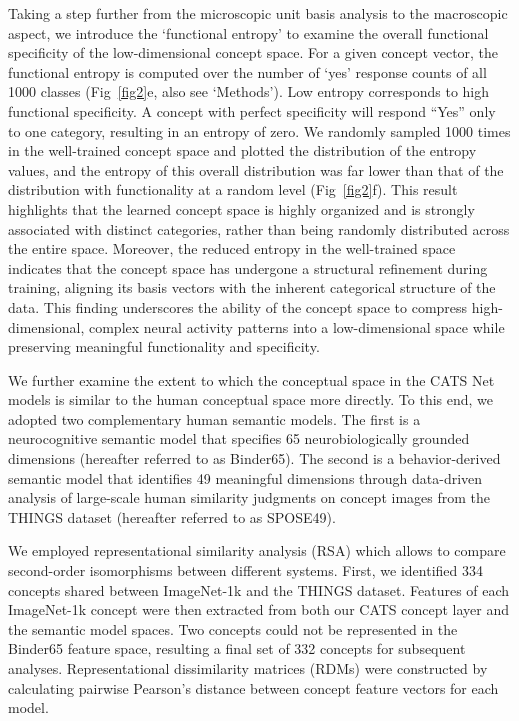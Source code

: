 \documentclass[pdflatex,sn-mathphys-num,lineno]{sn-jnl}%
\begin{document}
\begin{CJK}{UTF8}{gbsn}
Taking a step further from the microscopic unit basis analysis to the macroscopic aspect, we introduce the ‘functional entropy’ to examine the overall functional specificity of the low-dimensional concept space. For a given concept vector, the functional entropy is computed over the number of ‘yes’ response counts of all 1000 classes (Fig~\ref{fig2}e, also see ‘Methods’). Low entropy corresponds to high functional specificity. A concept with perfect specificity will respond “Yes” only to one category, resulting in an entropy of zero. We randomly sampled 1000 times in the well-trained concept space and plotted the distribution of the entropy values, and the entropy of this overall distribution was far lower than that of the distribution with functionality at a random level (Fig~\ref{fig2}f). This result highlights that the learned concept space is highly organized and is strongly associated with distinct categories, rather than being randomly distributed across the entire space. Moreover, the reduced entropy in the well-trained space indicates that the concept space has undergone a structural refinement during training, aligning its basis vectors with the inherent categorical structure of the data. This finding underscores the ability of the concept space to compress high-dimensional, complex neural activity patterns into a low-dimensional space while preserving meaningful functionality and specificity.

We further examine the extent to which the conceptual space in the CATS Net models is similar to the human conceptual space more directly. To this end, we adopted two complementary human semantic models. The first is a neurocognitive semantic model that specifies 65 neurobiologically grounded dimensions \cite{binder_toward_2016} (hereafter referred to as Binder65). The second is a behavior-derived semantic model that identifies 49 meaningful dimensions through data-driven analysis of large-scale human similarity judgments on concept images from the THINGS dataset \cite{hebart_revealing_2020} (hereafter referred to as SPOSE49).

We employed representational similarity analysis (RSA) \cite{kriegeskorte_representational_2008} which allows to compare second-order isomorphisms between different systems. First, we identified 334 concepts shared between ImageNet-1k and the THINGS dataset. Features of each ImageNet-1k concept were then extracted from both our CATS concept layer and the semantic model spaces. Two concepts could not be represented in the Binder65 feature space, resulting a final set of 332 concepts for subsequent analyses. Representational dissimilarity matrices (RDMs) were constructed by calculating pairwise Pearson’s distance between concept feature vectors for each model. 


\end{CJK}
\end{document}

